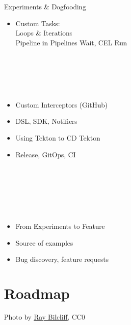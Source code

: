 \documentclass[aspectratio=169,11pt,hyperref={colorlinks=true}]{beamer}
\begin{document}
\begin{2columnsframe}{Experiments \& Dogfooding}%
  {%
  \begin{itemize}
    \item Custom Tasks:\\
          Loops \& Iterations \\
          Pipeline in Pipelines
          Wait, CEL Run
  \end{itemize}
  ~\\
  ~\\
  ~\\
  ~\\
  \begin{itemize}
    \item Custom Interceptors (GitHub)
    \item DSL, SDK, Notifiers
  \end{itemize}
  }{%
  \begin{itemize}
    \item Using Tekton to CD Tekton
    \item Release, GitOps, CI \\~
  \end{itemize}
  ~\\
  ~\\
  ~\\
  ~\\
  \begin{itemize}
    \item From Experiments to Feature
    \item Source of examples
    \item Bug discovery, feature requests
  \end{itemize}
  }
\end{2columnsframe}

\section[Roadmap]{Roadmap}
\begin{sectionwithpic}{Photo by \href{https://www.pexels.com/@raybilcliff}{\underline{Ray Bilcliff}}, CC0}
\end{sectionwithpic}
\end{document}
